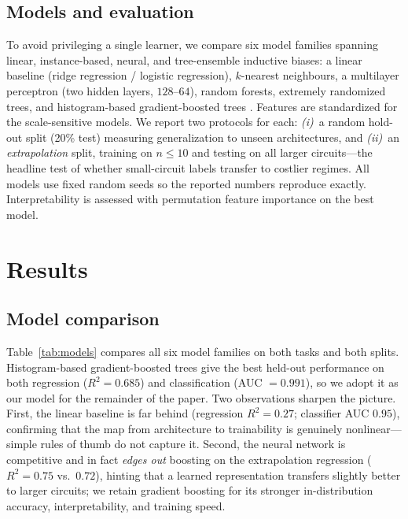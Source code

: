 \documentclass[journal]{IEEEtran}
\newcommand{\RsqHold}{0.685}
\newcommand{\AucHold}{0.991}
\newcommand{\ExtrapCut}{10}
\begin{document}
\subsection{Models and evaluation}
To avoid privileging a single learner, we compare six model families spanning
linear, instance-based, neural, and tree-ensemble inductive biases: a linear
baseline (ridge regression / logistic regression), $k$-nearest neighbours, a
multilayer perceptron (two hidden layers, $128$--$64$), random forests, extremely
randomized trees, and histogram-based gradient-boosted trees
\cite{ke2017lightgbm,pedregosa2011scikit}. Features are standardized for the
scale-sensitive models. We report two protocols for each: \emph{(i)}~a random
hold-out split (20\% test) measuring generalization to unseen architectures, and
\emph{(ii)}~an \emph{extrapolation} split, training on $n\le\ExtrapCut{}$ and
testing on all larger circuits---the headline test of whether small-circuit labels
transfer to costlier regimes. All models use fixed random seeds so the reported
numbers reproduce exactly. Interpretability is assessed with permutation feature
importance on the best model.

\section{Results}
\subsection{Model comparison}
Table~\ref{tab:models} compares all six model families on both tasks and both
splits. Histogram-based gradient-boosted trees give the best held-out performance
on both regression ($R^2=\RsqHold{}$) and classification (AUC $=\AucHold{}$), so we
adopt it as our model for the remainder of the paper. Two observations sharpen the
picture. First, the linear baseline is far behind (regression $R^2=0.27$; classifier
AUC $0.95$), confirming that the map from architecture to trainability is
genuinely nonlinear---simple rules of thumb do not capture it. Second, the neural
network is competitive and in fact \emph{edges out} boosting on the extrapolation
regression ($R^2=0.75$ vs.\ $0.72$), hinting that a learned representation transfers
slightly better to larger circuits; we retain gradient boosting for its stronger
in-distribution accuracy, interpretability, and training speed.

\begin{table}[t]
\centering
\caption{Model comparison across both prediction tasks and both evaluation
splits. Best hold-out result in \textbf{bold}.}
\label{tab:models}
\small

\end{table}
\end{document}
